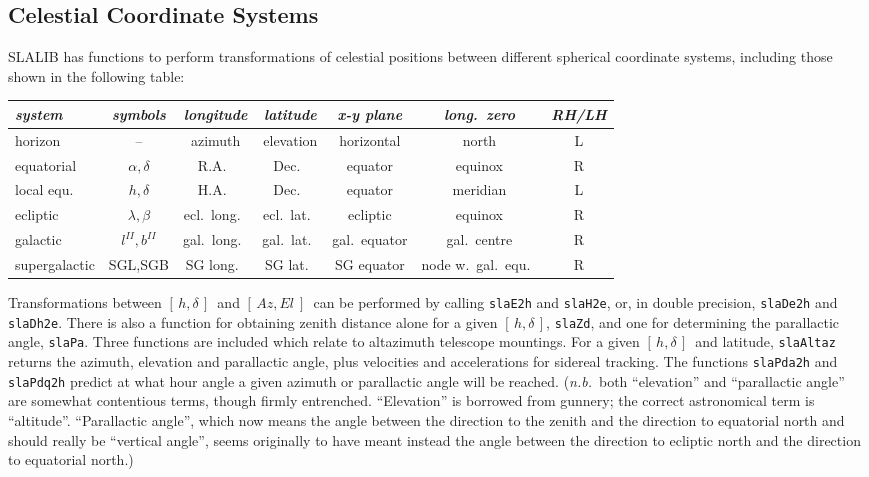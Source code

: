 \documentclass[11pt,fleqn,twoside]{article}
\renewcommand{\_}{{\tt\char'137}}     %
\newcommand{\hadec}     {$[\,h,\delta\,]$}
\newcommand{\azel}      {$[\,Az,El~]$}
\begin{document}
\subsection {Celestial Coordinate Systems}
SLALIB has functions to perform transformations
of celestial positions between different spherical
coordinate systems, including those shown in the following table:

\begin{center}
\begin{tabular}{|l|c|c|c|c|c|c|} \hline
{\it system} & {\it symbols} & {\it longitude} & {\it latitude} &
          {\it x-y plane} & {\it long.\ zero} & {\it RH/LH}
\\ \hline \hline
horizon & -- & azimuth & elevation & horizontal & north & L
\\ \hline
equatorial & $\alpha,\delta$ & R.A.\ & Dec.\ & equator & equinox & R
\\ \hline
local equ.\ & $h,\delta$ & H.A.\ & Dec.\ & equator & meridian & L
\\ \hline
ecliptic & $\lambda,\beta$ & ecl.\ long.\ & ecl.\ lat.\ &
                                       ecliptic & equinox & R
\\ \hline
galactic & $l^{I\!I},b^{I\!I}$ & gal.\ long.\ & gal.\ lat.\ &
                                       gal.\ equator & gal.\ centre & R
\\ \hline
supergalactic & SGL,SGB & SG long.\ & SG lat.\ &
                                       SG equator & node w.\ gal.\ equ.\ & R
\\ \hline
\end{tabular}
\end{center}

Transformations between \hadec\ and \azel\ can be performed by
calling
{\tt slaE2h}
and
{\tt slaH2e},
or, in double precision,
{\tt slaDe2h}
and
{\tt slaDh2e}.
There is also a function for obtaining
zenith distance alone for a given \hadec,
{\tt slaZd},
and one for determining the parallactic angle,
{\tt slaPa}.
Three functions are included which relate to altazimuth telescope
mountings.  For a given \hadec\ and latitude,
{\tt slaAltaz}
returns the azimuth, elevation and parallactic angle, plus
velocities and accelerations for sidereal tracking.
The functions
{\tt slaPda2h}
and
{\tt slaPdq2h}
predict at what hour angle a given azimuth or
parallactic angle will be reached.  ({\it n.b.}~both ``elevation''
and ``parallactic angle'' are somewhat contentious terms, though
firmly entrenched.  ``Elevation'' is borrowed from gunnery;
the correct astronomical term is
``altitude''. ``Parallactic angle'', which now means the
angle between the direction to the zenith and
the direction to equatorial north and should really be
``vertical angle'', seems originally to have meant
instead the angle between the direction to ecliptic north and the
direction to equatorial north.)
\end{document}
